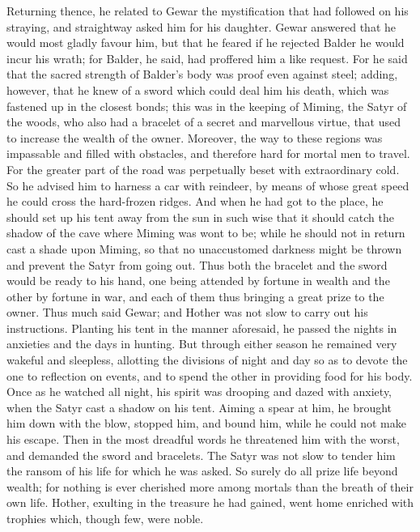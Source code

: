 \documentclass[10pt,a4paper]{report}
\begin{document}
Returning thence, he related to Gewar the mystification that had followed on his straying, and straightway asked him for his daughter. Gewar answered that he would most gladly favour him, but that he feared if he rejected Balder he would incur his wrath; for Balder, he said, had proffered him a like request. For he said that the sacred strength of Balder's body was proof even against steel; adding, however, that he knew of a sword which could deal him his death, which was fastened up in the closest bonds; this was in the keeping of Miming, the Satyr of the woods, who also had a bracelet of a secret and marvellous virtue, that used to increase the wealth of the owner. Moreover, the way to these regions was impassable and filled with obstacles, and therefore hard for mortal men to travel. For the greater part of the road was perpetually beset with extraordinary cold. So he advised him to harness a car with reindeer, by means of whose great speed he could cross the hard-frozen ridges. And when he had got to the place, he should set up his tent away from the sun in such wise that it should catch the shadow of the cave where Miming was wont to be; while he should not in return cast a shade upon Miming, so that no unaccustomed darkness might be thrown and prevent the Satyr from going out. Thus both the bracelet and the sword would be ready to his hand, one being attended by fortune in wealth and the other by fortune in war, and each of them thus bringing a great prize to the owner. Thus much said Gewar; and Hother was not slow to carry out his instructions. Planting his tent in the manner aforesaid, he passed the nights in anxieties and the days in hunting. But through either season he remained very wakeful and sleepless, allotting the divisions of night and day so as to devote the one to reflection on events, and to spend the other in providing food for his body. Once as he watched all night, his spirit was drooping and dazed with anxiety, when the Satyr cast a shadow on his tent. Aiming a spear at him, he brought him down with the blow, stopped him, and bound him, while he could not make his escape. Then in the most dreadful words he threatened him with the worst, and demanded the sword and bracelets. The Satyr was not slow to tender him the ransom of his life for which he was asked. So surely do all prize life beyond wealth; for nothing is ever cherished more among mortals than the breath of their own life. Hother, exulting in the treasure he had gained, went home enriched with trophies which, though few, were noble.\\
\end{document}
